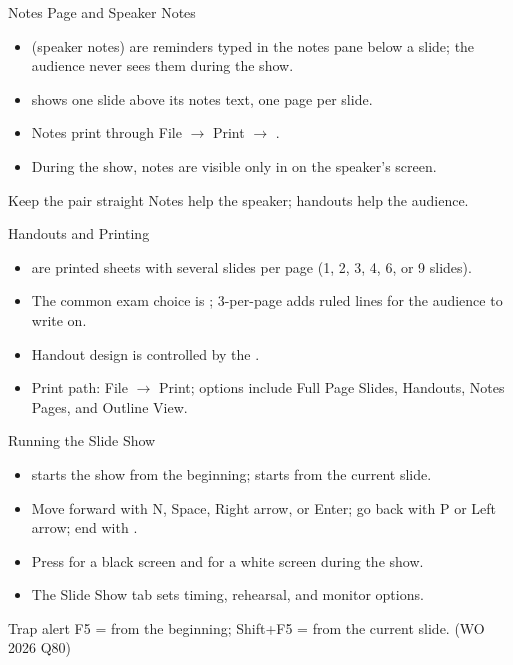 \documentclass[aspectratio=169]{beamer}
\begin{document}
\begin{frame}{Notes Page and Speaker Notes}
  \begin{itemize}
    \item {} (speaker notes) are reminders typed in the notes pane
      below a slide; the audience never sees them during the show.
    \item {} shows one slide above its notes text, one page
      per slide.
    \item Notes print through File $\rightarrow$ Print $\rightarrow$
      .
    \item During the show, notes are visible only in  on
      the speaker's screen.
  \end{itemize}
  \begin{block}{Keep the pair straight}
    Notes help the speaker; handouts help the audience.
  \end{block}
\end{frame}

\begin{frame}{Handouts and Printing}
  \begin{itemize}
    \item {} are printed sheets with several slides per page (1, 2,
      3, 4, 6, or 9 slides).
    \item The common exam choice is ; 3-per-page adds
      ruled lines for the audience to write on.
    \item Handout design is controlled by the .
    \item Print path: File $\rightarrow$ Print; options include Full Page
      Slides, Handouts, Notes Pages, and Outline View.
  \end{itemize}
\end{frame}

\begin{frame}{Running the Slide Show}
  \begin{itemize}
    \item {} starts the show from the beginning;  starts
      from the current slide.
    \item Move forward with N, Space, Right arrow, or Enter; go back with P or
      Left arrow; end with .
    \item Press  for a black screen and  for a white screen
      during the show.
    \item The Slide Show tab sets timing, rehearsal, and monitor options.
  \end{itemize}
  \begin{alertblock}{Trap alert}
    F5 = from the beginning; Shift+F5 = from the current slide. (WO 2026 Q80)
  \end{alertblock}
\end{frame}
\end{document}
